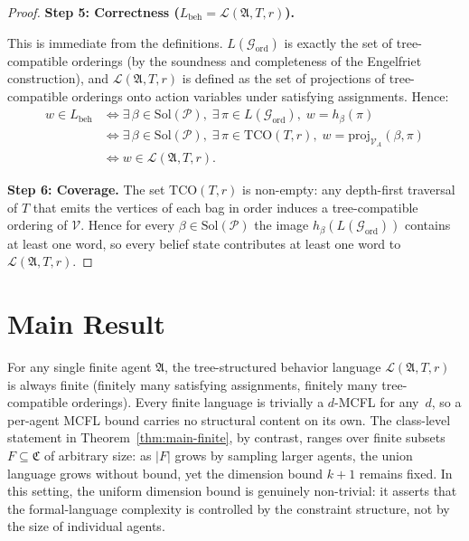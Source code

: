 \documentclass[runningheads]{llncs}
\begin{document}
\begin{proof}
\medskip
\noindent\textbf{Step 5: Correctness ($L_{\mathrm{beh}} = \mathcal{L}(\mathfrak{A}, T, r)$).}

This is immediate from the definitions.
$L(\mathcal{G}_{\mathrm{ord}})$ is exactly the set of tree-compatible orderings (by the soundness and completeness of the Engelfriet construction), and $\mathcal{L}(\mathfrak{A}, T, r)$ is defined as the set of projections of tree-compatible orderings onto action variables under satisfying assignments.
Hence:
\begin{align*}
  w \in L_{\mathrm{beh}} &\iff \exists\, \beta \in \mathrm{Sol}(\mathcal{P}),\; \exists\, \pi \in L(\mathcal{G}_{\mathrm{ord}}),\; w = h_\beta(\pi) \\
    &\iff \exists\, \beta \in \mathrm{Sol}(\mathcal{P}),\; \exists\, \pi \in \mathrm{TCO}(T, r),\; w = \mathrm{proj}_{\mathcal{V}_A}(\beta, \pi) \\
    &\iff w \in \mathcal{L}(\mathfrak{A}, T, r).
\end{align*}

\medskip
\noindent\textbf{Step 6: Coverage.}
The set $\mathrm{TCO}(T, r)$ is non-empty: any depth-first traversal of $T$ that emits the vertices of each bag in order induces a tree-compatible ordering of $\mathcal{V}$. Hence for every $\beta \in \mathrm{Sol}(\mathcal{P})$ the image $h_\beta(L(\mathcal{G}_{\mathrm{ord}}))$ contains at least one word, so every belief state contributes at least one word to $\mathcal{L}(\mathfrak{A}, T, r)$.
\end{proof}

\section{Main Result}\label{sec:main}

\begin{remark}\label{rem:non-vacuity}
For any single finite agent $\mathfrak{A}$, the tree-structured behavior language $\mathcal{L}(\mathfrak{A}, T, r)$ is always finite (finitely many satisfying assignments, finitely many tree-compatible orderings).
Every finite language is trivially a $d$-MCFL for any~$d$, so a per-agent MCFL bound carries no structural content on its own.
The class-level statement in Theorem~\ref{thm:main-finite}, by contrast, ranges over finite subsets $F \subseteq \mathfrak{C}$ of arbitrary size: as $|F|$ grows by sampling larger agents, the union language grows without bound, yet the dimension bound $k+1$ remains fixed.
In this setting, the uniform dimension bound is genuinely non-trivial: it asserts that the formal-language complexity is controlled by the constraint structure, not by the size of individual agents.
\end{remark}
\end{document}
